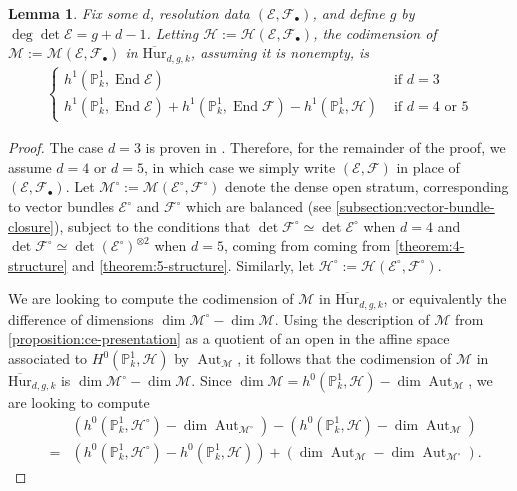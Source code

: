 \documentclass[12 pt]{amsart}
\newcommand{\rboxed}[1]{#1}
\theoremstyle{plain}
\newtheorem{lemma}[theorem]{Lemma}
\theoremstyle{definition}
\theoremstyle{remark}
\numberwithin{equation}{section}
\newcommand\bp{\mathbb P}
\newcommand\sce{\mathscr E}
\newcommand\scf{\mathscr F}
\newcommand\sch{\mathscr H}
\newcommand\bighurg[3]{\overline{\mathrm{Hur}}_{#1,#2, #3}} %
\newcommand\ce{\mathscr M} %
\DeclareMathOperator\End{End}
\DeclareMathOperator\aut{Aut}
\begin{document}
\begin{lemma} \label{lemma:codimension-computation} Fix some $d$, resolution
	data $(\sce, \scf_\bullet)$, and define $g$ by $\deg \det \sce = g + d - 1$.
	Letting $\rboxed{\sch} := \sch(\sce, \scf_\bullet)$, the codimension of
	$\rboxed{\ce }:= \ce(\sce, \scf_\bullet)$ in $\bighurg d g k$, assuming it
	is nonempty, is \begin{align*} \begin{cases} h^1(\bp^1_k, \End \sce) & \text{ if
	} d = 3 \\ h^1(\bp^1_k, \End \sce)+ h^1(\bp^1_k, \End
	\scf) - h^1(\bp^1_k, \sch) & \text{ if } d = 4 \text{ or
	} 5 \end{cases} \end{align*} \end{lemma} \begin{proof}
	The case $d = 3$ is proven in \cite[Prop. 1.4]{patel:thesis}.
	Therefore, for the remainder of the proof, we assume $d = 4$ or $d = 5$,
	in which case we simply write $(\sce, \scf)$ in place of $(\sce,
	\scf_\bullet)$.
		Let $\rboxed{\ce^{\circ}} := \ce(\sce^\circ,
		\scf^\circ)$ denote the dense open
		stratum, corresponding to vector bundles
		$\sce^\circ$ and $\scf^\circ$ which are
	balanced (see \autoref{subsection:vector-bundle-closure}),
		subject to the conditions that $\det \scf^\circ \simeq
		\det \sce^\circ$ when $d = 4$ and $\det
		\scf^\circ \simeq
	\det (\sce^\circ)^{\otimes 2}$ when $d = 5$, coming from
		coming from \autoref{theorem:4-structure} and
		\autoref{theorem:5-structure}.
		Similarly, let $\sch^\circ := \sch(\sce^\circ, \scf^\circ).$

		We are looking to compute the codimension of $\ce$ in $\bighurg d g	k$,
		or equivalently the difference of dimensions $\dim \ce^\circ -
		\dim \ce$.
		Using the description of
			$\ce$ from 
			\autoref{proposition:ce-presentation}
			as a quotient of an open in the
			affine space associated to $H^0(\bp^1_k,
			\sch)$ by
			$\aut_{\ce}$, it follows that the
			codimension of $\ce$ in $\bighurg d g k$ is
			$\dim \ce^{\circ} - \dim \ce$.  Since
			$\dim \ce = h^0(\bp^1_k, \sch) - \dim \aut_{\ce}$, we
			are looking to compute 
			\begin{equation}
			\begin{aligned}
				\label{equation:codimension-computation}
				& & 	(h^0(\bp^1_k,
				\sch^\circ) - \dim \aut_{\ce^\circ}) -
		(h^0(\bp^1_k, \sch) - \dim
		\aut_{\ce}) \\ & =&  (h^0(\bp^1_k,
		\sch^\circ) -
	h^0(\bp^1_k, \sch)) +(\dim
	\aut_{\ce} - \dim \aut_{\ce^\circ}).  
\end{aligned}
\end{equation}


\end{proof}
\end{document}
